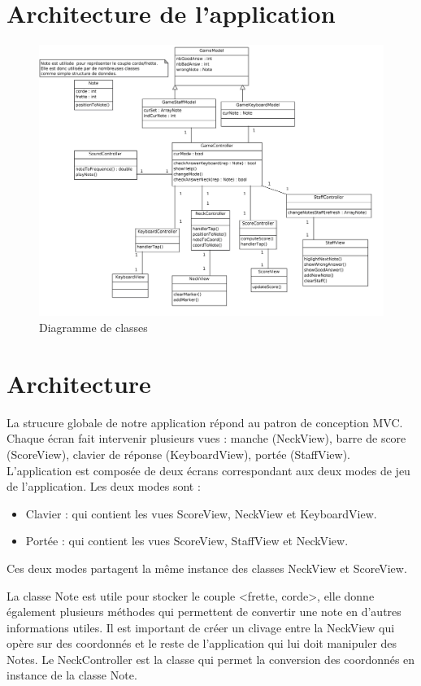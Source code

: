 \documentclass{scrreprt}
\begin{document}
\section{Architecture de l'application}
\begin{figure}[h!]
	\includegraphics[width=\textwidth]{str-images/Diagrammedeclasses.png}
	\caption{Diagramme de classes}
\end{figure}

\newpage



\section{Architecture}
La strucure globale de notre application répond au patron de conception MVC.
Chaque écran fait intervenir plusieurs vues : manche (NeckView), barre de score (ScoreView), clavier de réponse (KeyboardView), portée (StaffView).
L'application est composée de deux écrans correspondant aux deux modes de jeu de l'application.
Les deux modes sont :
\begin{itemize}
	\item Clavier : qui contient les vues ScoreView, NeckView et KeyboardView.
	\item Portée : qui contient les vues ScoreView, StaffView et NeckView.
\end{itemize}
Ces deux modes partagent la même instance des classes NeckView et ScoreView.

La classe Note est utile pour stocker le couple <frette, corde>, elle donne également plusieurs méthodes qui permettent de convertir une note en d'autres informations utiles. 
Il est important de créer un clivage entre la NeckView qui opère sur des coordonnés et le reste de l'application qui lui doit manipuler des Notes. 
Le NeckController est la classe qui permet la conversion des coordonnés en instance de la classe Note.
\end{document}
